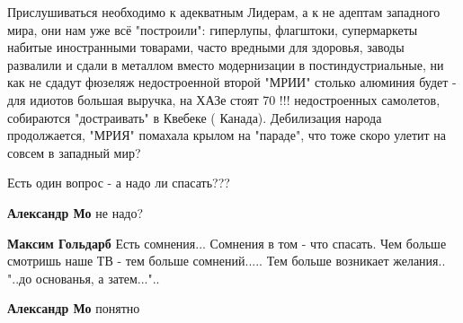 \begin{itemize}
Прислушиваться необходимо к адекватным Лидерам, а к не адептам западного мира,
они нам уже всё "построили": гиперлупы, флагштоки, супермаркеты набитые
иностранными товарами, часто вредными для здоровья, заводы развалили и сдали в
металлом вместо модернизации в постиндустриальные, ни как не сдадут фюзеляж
недостроенной второй "МРИИ" столько алюминия будет - для идиотов большая
выручка, на ХАЗе стоят 70 !!! недостроенных самолетов, собираются "достраивать"
в Квебеке ( Канада). Дебилизация народа продолжается, "МРИЯ" помахала крылом на
"параде", что тоже скоро улетит на совсем в западный мир?


 
Есть один вопрос - а надо ли спасать???

\begin{itemize}
 
\textbf{Александр Мо} не надо?

 
\textbf{Максим Гольдарб} Есть сомнения... Сомнения в том - что спасать. Чем
больше смотришь наше ТВ - тем больше сомнений..... Тем больше возникает
желания.. "..до основанья, а затем..."..

 
\textbf{Александр Мо} понятно
\end{itemize}

 

\end{itemize}
